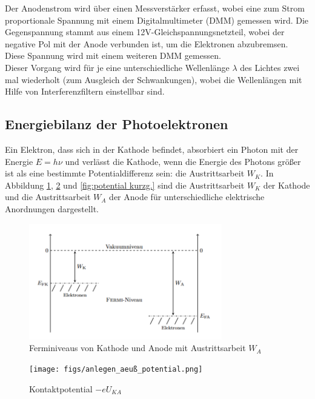 Der Anodenstrom wird über einen Messverstärker erfasst, 
wobei eine zum Strom proportionale Spannung mit einem 
Digitalmultimeter (DMM) gemessen wird. Die Gegenspannung 
stammt aus einem 12V-Gleichspannungsnetzteil, 
wobei der negative Pol mit der Anode verbunden ist, 
um die Elektronen abzubremsen. Diese Spannung wird 
mit einem weiteren DMM gemessen.\\
Dieser Vorgang wird für je eine unterschiedliche Wellenlänge
$\lambda$ des Lichtes zwei mal wiederholt (zum Ausgleich der Schwankungen), wobei die
Wellenlängen mit Hilfe von Interferenzfiltern
einstellbar sind.


\subsection{Energiebilanz der Photoelektronen}
Ein Elektron, dass sich in der Kathode befindet, absorbiert ein Photon mit der Energie $E = h\nu$ und verlässt die Kathode, wenn die Energie des Photons größer ist als eine bestimmte Potentialdifferenz sein: die Austrittsarbeit $W_K$.
In Abbildung \ref{fig:kathode-anode}, \ref{fig:potential ext} und \ref{fig:potential kurzg.} sind die Austrittsarbeit $W_K$ der Kathode und die Austrittsarbeit $W_A$ der Anode für unterschiedliche elektrische Anordnungen dargestellt.\\ %


\begin{figure}[htbp]
    \centering
    \includegraphics[width=0.75\textwidth]{figs/baenderschema_kathode_anode.png}
    \caption{ Ferminiveaus von Kathode und Anode mit Austrittsarbeit $W_A$ \cite{praktikum}}
    \label{fig:kathode-anode}
\end{figure}
\FloatBarrier

\begin{figure}[htbp]
    \centering
    \texttt{[image: figs/anlegen\_aeuß\_potential.png]}
    \caption{ Kontaktpotential $-eU_{KA}$ \cite{praktikum}}
    \label{fig:potential ext}
\end{figure}
\FloatBarrier


